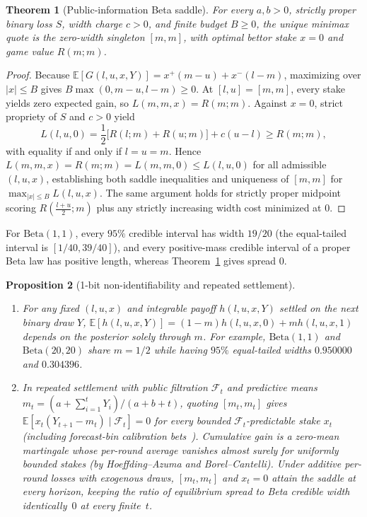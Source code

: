 \documentclass[11pt]{article}
\theoremstyle{plain}
\newtheorem{theorem}{Theorem}
\newtheorem{proposition}[theorem]{Proposition}
\theoremstyle{definition}
\theoremstyle{remark}
\begin{document}
\begin{theorem}[Public-information Beta saddle]\label{thm:saddle}
For every $a, b > 0$, strictly proper binary loss $S$, width charge $c > 0$, and finite budget $B \ge 0$, the unique minimax quote is the zero-width singleton $[m, m]$, with optimal bettor stake $x = 0$ and game value $R(m; m)$.
\end{theorem}

\begin{proof}
Because $\mathbb{E}[G(l, u, x, Y)] = x^+(m - u) + x^-(l - m)$, maximizing over $|x| \le B$ gives $B\max(0, m - u, l - m) \ge 0$. At $[l, u] = [m, m]$, every stake yields zero expected gain, so $L(m, m, x) = R(m; m)$. Against $x = 0$, strict propriety of $S$ and $c > 0$ yield
\[
L(l, u, 0) = \frac{1}{2}\bigl[R(l; m) + R(u; m)\bigr] + c(u - l) \ge R(m; m),
\]
with equality if and only if $l = u = m$. Hence $L(m, m, x) = R(m; m) = L(m, m, 0) \le L(l, u, 0)$ for all admissible $(l, u, x)$, establishing both saddle inequalities and uniqueness of $[m, m]$ for $\max_{|x|\le B} L(l, u, x)$. The same argument holds for strictly proper midpoint scoring $R(\frac{l+u}{2}; m)$ plus any strictly increasing width cost minimized at $0$.
\end{proof}

For $\mathrm{Beta}(1, 1)$, every $95\%$ credible interval has width $19/20$ (the equal-tailed interval is $[1/40, 39/40]$), and every positive-mass credible interval of a proper Beta law has positive length, whereas Theorem~\ref{thm:saddle} gives spread $0$.

\begin{proposition}[1-bit non-identifiability and repeated settlement]\label{prop:nonident}
\leavevmode
\begin{enumerate}[label=\textup{(\arabic*)}]
\item For any fixed $(l, u, x)$ and integrable payoff $h(l, u, x, Y)$ settled on the next binary draw $Y$, $\mathbb{E}[h(l, u, x, Y)] = (1-m)h(l, u, x, 0) + mh(l, u, x, 1)$ depends on the posterior solely through $m$. For example, $\mathrm{Beta}(1, 1)$ and $\mathrm{Beta}(20, 20)$ share $m = 1/2$ while having $95\%$ equal-tailed widths $0.950000$ and $0.304396$.
\item In repeated settlement with public filtration $\mathcal{F}_t$ and predictive means $m_t = (a + \sum_{i=1}^t Y_i)/(a + b + t)$, quoting $[m_t, m_t]$ gives $\mathbb{E}[x_t(Y_{t+1} - m_t) \mid \mathcal{F}_t] = 0$ for every bounded $\mathcal{F}_t$-predictable stake $x_t$ (including forecast-bin calibration bets~\cite{foster1998}). Cumulative gain is a zero-mean martingale whose per-round average vanishes almost surely for uniformly bounded stakes (by Hoeffding--Azuma and Borel--Cantelli). Under additive per-round losses with exogenous draws, $[m_t, m_t]$ and $x_t = 0$ attain the saddle at every horizon, keeping the ratio of equilibrium spread to Beta credible width identically~$0$ at every finite~$t$.
\end{enumerate}
\end{proposition}
\end{document}
